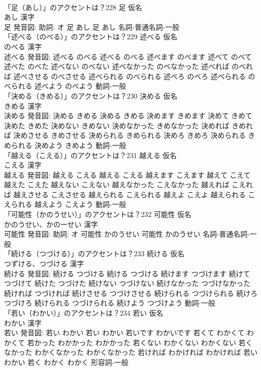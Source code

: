 \documentclass[8pt]{extreport}
\begin{document}
\begin{CJK}{UTF8}{min}
\\	「足（あし）」のアクセントは？228	足 仮名　
\\	あし 漢字　
\\	足 発音図: 助詞: オ	足 あし		足 あし				名詞-普通名詞-一般 
\\	「述べる（のべる）」のアクセントは？229	述べる 仮名　
\\	のべる 漢字　
\\	述べる 発音図:	述べる のべる		述べる のべる 述べます のべます 述べて のべて 述べた のべた 述べない のべない 述べなかった のべなかった 述べれば のべれば 述べさせる のべさせる 述べられる のべられる 述べろ のべろ 述べられる のべられる 述べよう のべよう				動詞-一般 
\\	「決める（きめる）」のアクセントは？230	決める 仮名　
\\	きめる 漢字　
\\	決める 発音図:	決める きめる		決める きめる 決めます きめます 決めて きめて 決めた きめた 決めない きめない 決めなかった きめなかった 決めれば きめれば 決めさせる きめさせる 決められる きめられる 決めろ きめろ 決められる きめられる 決めよう きめよう				動詞-一般 
\\	「越える（こえる）」のアクセントは？231	越える 仮名　
\\	こえる 漢字　
\\	越える 発音図:	越える こえる		越える こえる 越えます こえます 越えて こえて 越えた こえた 越えない こえない 越えなかった こえなかった 越えれば こえれば 越えさせる こえさせる 越えられる こえられる 越えよ こえよ 越えられる こえられる 越えよう こえよう				動詞-一般 
\\	「可能性（かのうせい）」のアクセントは？232	可能性 仮名　
\\	かのうせい、かのーせい 漢字　
\\	可能性 発音図: 助詞: オ	可能性 かのうせい		可能性 かのうせい				名詞-普通名詞-一般 
\\	「続ける（つづける）」のアクセントは？233	続ける 仮名　
\\	つずける、つづける 漢字　
\\	続ける 発音図:	続ける つづける		続ける つづける 続けます つづけます 続けて つづけて 続けた つづけた 続けない つづけない 続けなかった つづけなかった 続ければ つづければ 続けさせる つづけさせる 続けられる つづけられる 続けろ つづけろ 続けられる つづけられる 続けよう つづけよう				動詞-一般 
\\	「若い（わかい）」のアクセントは？234	若い 仮名　
\\	わかい 漢字　
\\	若い 発音図:	若い わかい		若い わかい 若いです わかいです 若くて わかくて わかくて 若かった わかかった わかかった 若くない わかくない わかくない 若くなかった わかくなかった わかくなかった 若ければ わかければ わかければ 若い わかい 若く わかく わかく				形容詞-一般 

\end{CJK}
\end{document}
